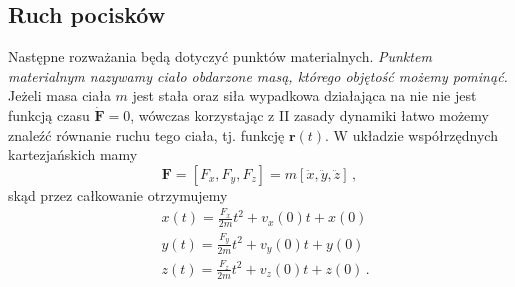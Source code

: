 \documentclass[../main.tex]{subfiles}
\begin{document}
\subsection{Ruch pocisków}
Następne rozważania będą dotyczyć punktów materialnych. \textit{Punktem materialnym nazywamy ciało
obdarzone masą, którego objętość możemy pominąć.} Jeżeli masa ciała \(m\) jest stała oraz siła
wypadkowa działająca na nie nie jest funkcją czasu \(\dot{\mathbf{F}}=0\), wówczas korzystając z II
zasady dynamiki łatwo możemy znaleźć równanie ruchu tego ciała, tj. funkcję \(\mathbf{r}(t)\). W
układzie współrzędnych kartezjańskich mamy
\begin{equation*}
    \mathbf{F}=[F_x,F_y,F_z]=m[\ddot x,\ddot y, \ddot z]\,,
\end{equation*}
skąd przez całkowanie otrzymujemy
\begin{equation*}
    \begin{split}
    &x(t)=\frac{F_x}{2m}t^2+v_x(0)t+x(0)\\
    &y(t)=\frac{F_y}{2m}t^2+v_y(0)t+y(0)\\
    &z(t)=\frac{F_z}{2m}t^2+v_z(0)t+z(0)\,.
    \end{split}
\end{equation*}
\end{document}
